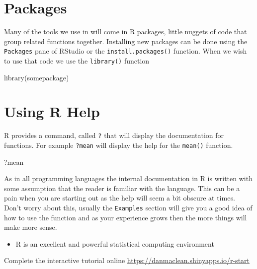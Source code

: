 \documentclass[
]{book}
\newenvironment{Shaded}{\begin{snugshade}}{\end{snugshade}}
\newcommand{\FunctionTok}[1]{\textcolor[rgb]{0.00,0.00,0.00}{#1}}
\newcommand{\NormalTok}[1]{#1}
\providecommand{\tightlist}{%
  \setlength{\itemsep}{0pt}\setlength{\parskip}{0pt}}
\newenvironment{task}
{ \begin{tcolorbox}[title=For you to do,title filled] }
{  \end{tcolorbox} }
\newenvironment{roundup}
{ \begin{tcolorbox}[colbacktitle=yellow!50!white,
title=Round Up,coltitle=black,
fonttitle=\bfseries] }
{  \end{tcolorbox} }
\begin{document}
\hypertarget{packages}{%
\section{Packages}\label{packages}}

Many of the tools we use in will come in R packages, little nuggets of code that group related functions together. Installing new packages can be done using the \texttt{Packages} pane of RStudio or the \texttt{install.packages()} function. When we wish to use that code we use the \texttt{library()} function

\begin{Shaded}
\begin{Highlighting}[]
\FunctionTok{library}\NormalTok{(somepackage)}
\end{Highlighting}
\end{Shaded}

\hypertarget{using-r-help}{%
\section{Using R Help}\label{using-r-help}}

R provides a command, called \texttt{?} that will display the documentation for functions. For example \texttt{?mean} will display the help for the \texttt{mean()} function.

\begin{Shaded}
\begin{Highlighting}[]
\NormalTok{?mean}
\end{Highlighting}
\end{Shaded}

As in all programming languages the internal documentation in R is written with some assumption that the reader is familiar with the language. This can be a pain when you are starting out as the help will seem a bit obscure at times. Don't worry about this, usually the \texttt{Examples} section will give you a good idea of how to use the function and as your experience grows then the more things will make more sense.

\begin{roundup}
\begin{itemize}
\tightlist
\item
  R is an excellent and powerful statistical computing environment
\end{itemize}
\end{roundup}

\begin{task}
Complete the interactive tutorial online \url{https://danmaclean.shinyapps.io/r-start}
\end{task}
\end{document}
